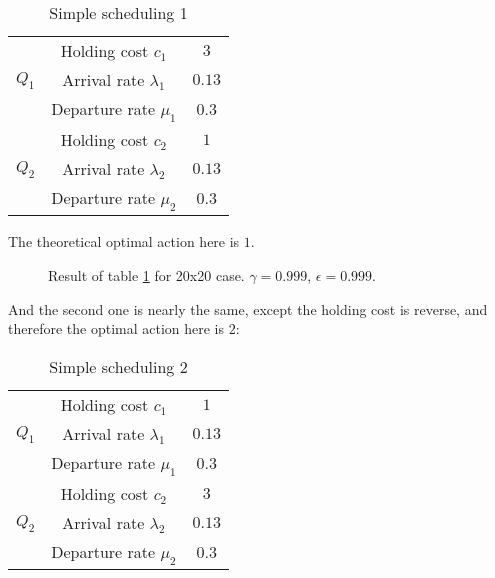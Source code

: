 \documentclass[
  a4paper, xcolor = usenames,dvipsnames]{article}
\theoremstyle{definition}
\theoremstyle{definition}
\theoremstyle{definition}
\theoremstyle{definition}
\theoremstyle{remark}
\begin{document}
\begin{table}[!htbp]
\caption{Simple scheduling 1}
\begin{center}
\begin{tabular}{c c c}
    \hline
    \multirow{3}{*}{$Q_{1}$} & Holding cost $c_{1}$ & $3$ \\
    & Arrival rate $\lambda_{1}$ & $0.13$ \\
    & Departure rate $\mu_{1}$ & $0.3$ \\
    \cline{2-3}
    \multirow{3}{*}{$Q_{2}$} & Holding cost $c_{2}$ & $1$ \\
    & Arrival rate $\lambda_{2}$ & $0.13$ \\
    & Departure rate $\mu_{2}$ & $0.3$ \\    
    \hline
\end{tabular}
\end{center}
\label{tab:simple-scheduling-1}
\end{table}

The theoretical optimal action here is \(1\).



\begin{figure}

{\centering {}

}

\caption{Result of table \ref{tab:simple-scheduling-1} for 20x20 case. \(\gamma = 0.999\), \(\epsilon = 0.999\).}\label{fig:20x20-simple-scheduling-1}
\end{figure}

And the second one is nearly the same, except the holding cost is reverse, and therefore the optimal action here is \(2\):

\begin{table}[!htbp]
\caption{Simple scheduling 2}
\begin{center}
\begin{tabular}{c c c}
    \hline
    \multirow{3}{*}{$Q_{1}$} & Holding cost $c_{1}$ & $1$ \\
    & Arrival rate $\lambda_{1}$ & $0.13$ \\
    & Departure rate $\mu_{1}$ & $0.3$ \\
    \cline{2-3}
    \multirow{3}{*}{$Q_{2}$} & Holding cost $c_{2}$ & $3$ \\
    & Arrival rate $\lambda_{2}$ & $0.13$ \\
    & Departure rate $\mu_{2}$ & $0.3$ \\    
    \hline
\end{tabular}
\end{center}
\label{tab:simple-scheduling-2}
\end{table}
\end{document}
